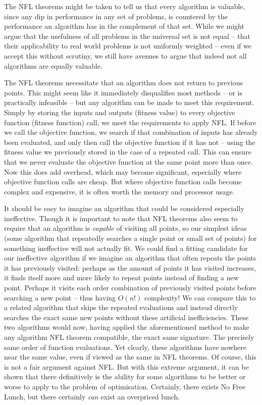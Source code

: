 \documentclass[
  a4paper,
  DIV=11,
  numbers=noendperiod]{scrartcl}
\newcommand{\+}{\phantom{-}}
\begin{document}
The NFL theorems might be taken to tell us that every algorithm is
valuable, since any dip in performance in any set of problems, is
countered by the performance an algorithm has in the complement of that
set. While we might argue that the usefulness of all problems in the
universal set is not equal -- that their applicability to real world
problems is not uniformly weighted -- even if we accept this without
scrutiny, we still have avenues to argue that indeed not all algorithms
are equally valuable.

The NFL theorems necessitate that an algorithm does not return to
previous points. This might seem like it immediately disqualifies most
methods -- or is practically infeasible -- but any algorithm can be made
to meet this requirement. Simply by storing the inputs and outputs
(fitness value) to every objective function (fitness function) call, we
meet the requirements to apply NFL. If before we call the objective
function, we search if that combination of inputs has already been
evaluated, and only then call the objective function if it has not --
using the fitness value we previously stored in the case of a repeated
call. This can ensure that we never evaluate the objective function at
the same point more than once. Now this does add overhead, which may
become significant, especially where objective function calls are cheap.
But where objective function calls become complex and expensive, it is
often worth the memory and processor usage.

It should be easy to imagine an algorithm that could be considered
especially ineffective. Though it is important to note that NFL theorems
also seem to require that an algorithm is \emph{capable} of visiting all
points, so our simplest ideas (some algorithm that repeatedly searches a
single point or small set of points) for something ineffective will not
actually fit. We could find a fitting candidate for our ineffective
algorithm if we imagine an algorithm that often repeats the points it
has previously visited: perhaps as the amount of points it has visited
increases, it finds itself more and more likely to repeat points instead
of finding a new point. Perhaps it visits each order combination of
previously visited points before searching a new point -- thus having
\(O(n!)\) complexity! We can compare this to a related algorithm that
skips the repeated evaluations and instead directly searches the exact
same new points without these artificial inefficiencies. These two
algorithms would now, having applied the aforementioned method to make
any algorithm NFL theorem compatible, the exact same signature. The
precisely same order of function evaluations. Yet clearly, these
algorithms have nowhere near the same value, even if viewed as the same
in NFL theorems. Of course, this is not a fair argument against NFL. But
with this extreme argument, it can be shown that there definitively is
the ability for some algorithms to be better or worse to apply to the
problem of optimisation. Certainly, there exists No Free Lunch, but
there certainly \emph{can} exist an overpriced lunch.
\end{document}
